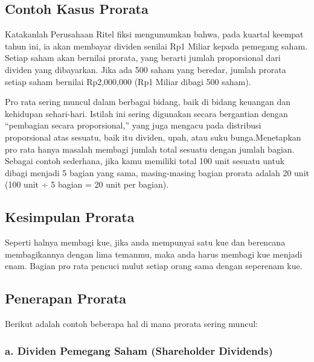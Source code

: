 \documentclass[
]{book}
\begin{document}
\hypertarget{contoh-kasus-prorata}{%
\subsection{Contoh Kasus Prorata}\label{contoh-kasus-prorata}}

Katakanlah Perusahaan Ritel fiksi mengumumkan bahwa, pada kuartal keempat tahun ini, ia akan membayar dividen senilai Rp1 Miliar kepada pemegang saham. Setiap saham akan bernilai prorata, yang berarti jumlah proporsional dari dividen yang dibayarkan. Jika ada 500 saham yang beredar, jumlah prorata setiap saham bernilai Rp2,000,000 (Rp1 Miliar dibagi 500 saham).

Pro rata sering muncul dalam berbagai bidang, baik di bidang keuangan dan kehidupan sehari-hari. Istilah ini sering digunakan secara bergantian dengan ``pembagian secara proporsional,'' yang juga mengacu pada distribusi proporsional atas sesuatu, baik itu dividen, upah, atau suku bunga.Menetapkan pro rata hanya masalah membagi jumlah total sesuatu dengan jumlah bagian. Sebagai contoh sederhana, jika kamu memiliki total 100 unit sesuatu untuk dibagi menjadi 5 bagian yang sama, masing-masing bagian prorata adalah 20 unit (100 unit ÷ 5 bagian = 20 unit per bagian).

\hypertarget{kesimpulan-prorata}{%
\subsection{Kesimpulan Prorata}\label{kesimpulan-prorata}}

Seperti halnya membagi kue, jika anda mempunyai satu kue dan berencana membagikannya dengan lima temanmu, maka anda harus membagi kue menjadi enam. Bagian pro rata pencuci mulut setiap orang sama dengan seperenam kue.

\hypertarget{penerapan-prorata}{%
\subsection{Penerapan Prorata}\label{penerapan-prorata}}

Berikut adalah contoh beberapa hal di mana prorata sering muncul:

\hypertarget{a.-dividen-pemegang-saham-shareholder-dividends}{%
\subsubsection*{a. Dividen Pemegang Saham (Shareholder Dividends)}\label{a.-dividen-pemegang-saham-shareholder-dividends}}
\end{document}
